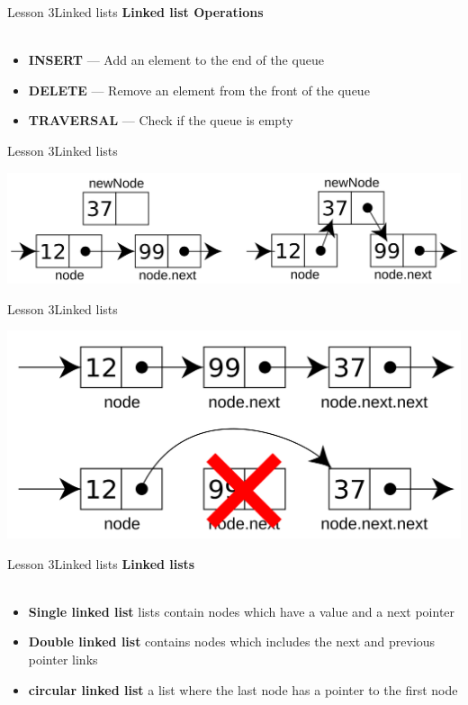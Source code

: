 \documentclass[aspectratio=1610]{beamer}
\begin{document}
\begin{frame}{Lesson 3}{Linked lists}
\LARGE
\textbf{Linked list Operations}\\~\\
\Large
\begin{itemize}
\item \textbf{INSERT} — Add an element to the end of the queue
\item \textbf{DELETE} — Remove an element from the front of the queue
\item \textbf{TRAVERSAL} — Check if the queue is empty
\end{itemize}
\end{frame}



\begin{frame}{Lesson 3}{Linked lists}
\begin{center}
\includegraphics[scale=0.12]{Images/linkedLists-addingnode}
\end{center}
\end{frame}


\begin{frame}{Lesson 3}{Linked lists}
\begin{center}
\includegraphics[scale=0.12]{Images/linkedLists-deletingnode}
\end{center}
\end{frame}


\begin{frame}{Lesson 3}{Linked lists}
\LARGE
\textbf{Linked lists}\\~\\
\Large
\begin{itemize}
	\item \textbf{Single linked list} lists contain nodes which have a value and a next pointer
\item \textbf{Double linked list} contains nodes which includes the next and previous pointer links
\item \textbf{circular linked list}  a list where the last node has a pointer to the first node
\end{itemize}
\end{frame}
\end{document}
